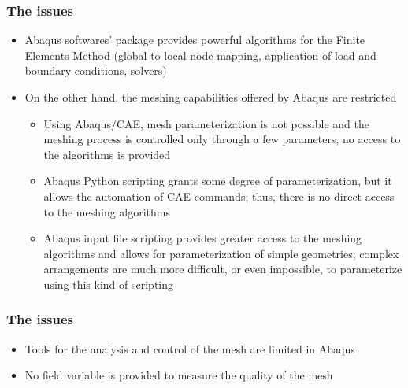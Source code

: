 \documentclass[first,firstsupp,lastsupp,handout,last,hyperref,table]{ETHclass}
\begin{document}
\begin{frame}[t]
  \frametitle{The issues}
  \vspace{-0.4cm}
  \begin{itemize}
  \justifying
\item {\scriptsize Abaqus softwares' package provides powerful algorithms for the Finite Elements Method (global to local node mapping, application of load and boundary conditions, solvers)}
\item {\scriptsize On the other hand, the meshing capabilities offered by Abaqus are restricted}
\begin{itemize}
  \justifying
\item {\scriptsize Using Abaqus/CAE, mesh parameterization is not possible and the meshing process is controlled only through a few parameters, no access to the algorithms is provided}
\item {\scriptsize Abaqus Python scripting grants some degree of parameterization, but it allows the automation of CAE commands; thus, there is no direct access to the meshing algorithms}
\item {\scriptsize Abaqus input file scripting provides greater access to the meshing algorithms and allows for parameterization of simple geometries; complex arrangements are much more difficult, or even impossible, to parameterize using this kind  of scripting}
  \end{itemize}
  \end{itemize}
\end{frame}

\begin{frame}[t]
  \frametitle{The issues}
  \begin{itemize}
  \justifying
   \item {\scriptsize Tools for the analysis and control of the mesh are limited in Abaqus}
\item {\scriptsize No field variable is provided to measure the quality of the mesh}
  \end{itemize}
\end{frame}
\end{document}
